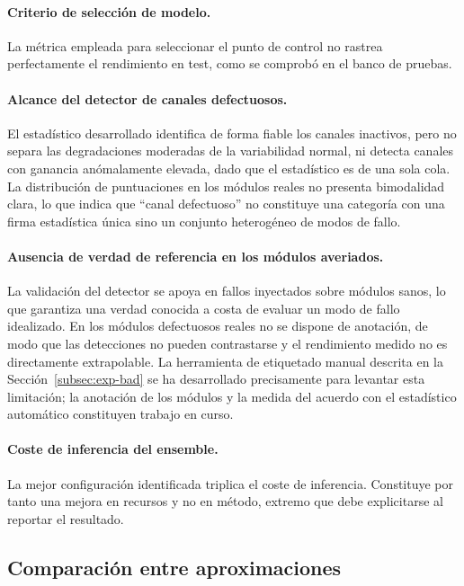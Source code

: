 \paragraph{Criterio de selección de modelo.} La métrica empleada para seleccionar el punto de
control no rastrea perfectamente el rendimiento en test, como se comprobó en el banco de pruebas.

\paragraph{Alcance del detector de canales defectuosos.} El estadístico desarrollado identifica de
forma fiable los canales inactivos, pero no separa las degradaciones moderadas de la variabilidad
normal, ni detecta canales con ganancia anómalamente elevada, dado que el estadístico es de una sola
cola. La distribución de puntuaciones en los módulos reales no presenta bimodalidad clara, lo que
indica que ``canal defectuoso'' no constituye una categoría con una firma estadística única sino un
conjunto heterogéneo de modos de fallo.

\paragraph{Ausencia de verdad de referencia en los módulos averiados.} La validación del detector se
apoya en fallos inyectados sobre módulos sanos, lo que garantiza una verdad conocida a costa de
evaluar un modo de fallo idealizado. En los módulos defectuosos reales no se dispone de anotación,
de modo que las detecciones no pueden contrastarse y el rendimiento medido no es directamente
extrapolable. La herramienta de etiquetado manual descrita en la Sección~\ref{subsec:exp-bad} se ha
desarrollado precisamente para levantar esta limitación; la anotación de los módulos y la medida del
acuerdo con el estadístico automático constituyen trabajo en curso.

\paragraph{Coste de inferencia del ensemble.} La mejor configuración identificada triplica el coste
de inferencia. Constituye por tanto una mejora en recursos y no en método, extremo que debe
explicitarse al reportar el resultado.

\subsection{Comparación entre aproximaciones}


